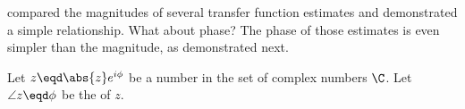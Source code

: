  compared the magnitudes of several transfer function estimates
and demonstrated a simple  relationship.
What about phase? The phase of those estimates is even simpler than the magnitude, as demonstrated next.
\begin{proposition}    %
Let $z\eqd\abs{z}e^{i\phi}$ be a  number in the set of complex numbers $\C$.
Let $\angle z\eqd\phi$ be the  of $z$.
\end{proposition}

